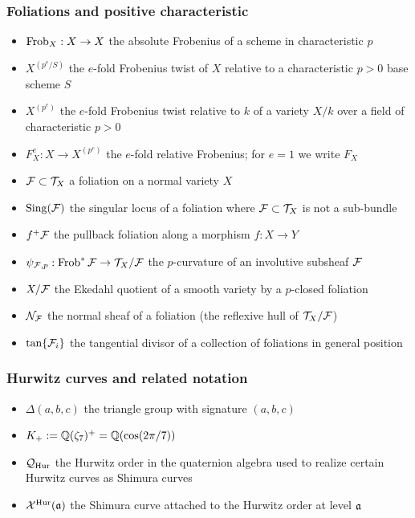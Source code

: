 \documentclass[main.tex]{subfiles}
\begin{document}
\subsubsection*{Foliations and positive characteristic}
\begin{itemize}
\item $\Frob_X : X \to X$ the absolute Frobenius of a scheme in characteristic $p$
\item $X^{(p^e/S)}$ the $e$-fold Frobenius twist of $X$ relative to a characteristic $p > 0$ base scheme $S$
\item $X^{(p^e)}$ the $e$-fold Frobenius twist relative to $k$ of a variety $X/k$ over a field of characteristic $p > 0$
\item $F_X^e : X \to X^{(p^e)}$ the $e$-fold relative Frobenius; for $e=1$ we write $F_X$
\item $\F \subset \T_X$ a foliation on a normal variety $X$
\item $\Sing(\F)$ the singular locus of a foliation where $\F \subset \T_X$ is not a sub-bundle
\item $f^+ \F$ the pullback foliation along a morphism $f : X \to Y$
\item $\psi_{\F,p} : \Frob^* \F \to \T_X / \F$ the $p$-curvature of an involutive subsheaf $\F$
\item $X/\F$ the Ekedahl quotient of a smooth variety by a $p$-closed foliation
\item $\cN_{\F}$ the normal sheaf of a foliation (the reflexive hull of $\T_X / \F$)
\item $\tan\{\F_i\}$ the tangential divisor of a collection of foliations in general position
\end{itemize}


\subsubsection*{Hurwitz curves and related notation}
\begin{itemize}
\item $\Delta(a,b,c)$ the triangle group with signature $(a,b,c)$
\item $K_+ := \Q(\zeta_7)^+ = \Q(\cos(2\pi/7))$
\item $\cQ_{\Hur}$ the Hurwitz order in the quaternion algebra used to realize certain Hurwitz curves as Shimura curves
\item $\X^{\Hur}(\aa)$ the Shimura curve attached to the Hurwitz order at level $\aa$
\end{itemize}
\end{document}
